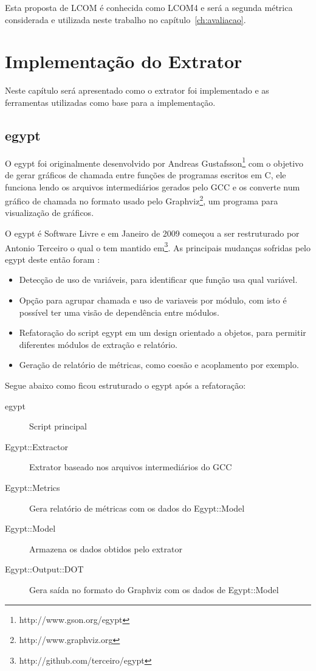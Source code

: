 Esta proposta de LCOM é conhecida como LCOM4 e será a segunda métrica considerada
e utilizada neste trabalho no capítulo~\ref{ch:avaliacao}.


\chapter{Implementação do Extrator} \label{ch:implementacao}

Neste capítulo será apresentado como o extrator foi implementado e as
ferramentas utilizadas como base para a implementação.

\section{egypt} \label{sec:egypt}

O egypt foi originalmente desenvolvido por Andreas
Gustafsson\footnote{http://www.gson.org/egypt} com o objetivo de gerar gráficos
de chamada entre funções de programas escritos em C, ele funciona lendo os
arquivos intermediários gerados pelo GCC e os
converte num gráfico de chamada no formato usado pelo
Graphviz\footnote{http://www.graphviz.org}, um programa para visualização de
gráficos.

O egypt é Software Livre e em Janeiro de 2009 começou a ser restruturado por
Antonio Terceiro o qual o tem mantido
em\footnote{http://github.com/terceiro/egypt}. As principais mudanças sofridas
pelo egypt deste então foram \cite{structuralComplexityEvolution}:

\begin{itemize}
\item Detecção de uso de variáveis, para identificar que função usa qual
variável.
\item Opção para agrupar chamada e uso de variaveis por módulo, com isto é
possível ter uma visão de dependência entre módulos.
\item Refatoração do script egypt em um design orientado a objetos, para
permitir diferentes módulos de extração e relatório.
\item Geração de relatório de métricas, como coesão e acoplamento por exemplo.
\end{itemize}

Segue abaixo como ficou estruturado o egypt após a refatoração:

\begin{description}
\item[egypt] Script principal
\item[Egypt::Extractor] Extrator baseado nos arquivos intermediários do GCC
\item[Egypt::Metrics] Gera relatório de métricas com os dados do Egypt::Model
\item[Egypt::Model] Armazena os dados obtidos pelo extrator
\item[Egypt::Output::DOT] Gera saída no formato do Graphviz com os dados de Egypt::Model
\end{description}

